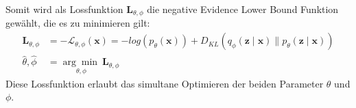 Somit wird als Lossfunktion $\mathbf{L}_{\theta,\phi}$ die negative Evidence Lower Bound Funktion gewählt, die es zu minimieren gilt:
\begin{align}
    \mathbf{L}_{\theta,\phi} &= -\mathcal{L}_{\theta,\phi}(\mathbf{x}) = -log(p_\theta(\mathbf{x})) + D_{KL}(q_\phi(\mathbf{z\mid x})\parallel p_\theta(\mathbf{z\mid x}))  \\
    \hat{\theta},\hat{\phi} &= \underset{\theta, \phi}{\arg\min \ } \mathbf{L}_{\theta,\phi}
\end{align}
Diese Lossfunktion erlaubt das simultane Optimieren der beiden Parameter $\theta$ und $\phi$.




